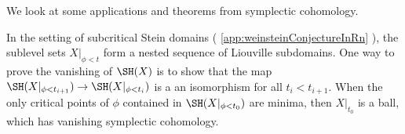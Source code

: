 
We look at some applications and theorems from symplectic cohomology. 





In the setting of subcritical Stein domains ( 
\cref{app:weinsteinConjectureInRn} ), the sublevel sets $X|_{\phi< t}$ 
form 
a nested sequence of Liouville subdomains. One way to prove the vanishing of $\SH(X)$ is to show that the map $\SH(X|_{\phi< t_{i+1}})\to \SH(X|_{\phi< t_{i}})$ is a an isomorphism for all $t_{i} < t_{i+1}$. When the only critical points of $\phi$ contained in $\SH(X|_{\phi < t_0})$ are minima, then $X|_{t_0}$ is a ball, which has vanishing symplectic cohomology.
